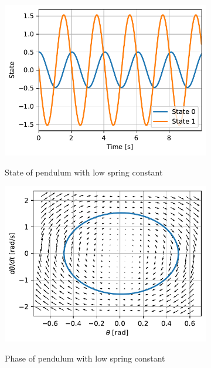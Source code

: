\documentclass{cmc}
\begin{document}
\begin{figure}[H]
  \centering
  \begin{subfigure}[b]{0.49\textwidth}
    { \centering
      \includegraphics[width=\textwidth]{figures/State_Spring_Constant_1(x0_=_[0dot5,_0dot1]).pdf}
    }
    \caption{State of pendulum with low spring constant}
    \label{fig:state-pendulum-spring-constant-1}
  \end{subfigure}
  \begin{subfigure}[b]{0.49\textwidth}
    { \centering
      \includegraphics[width=\textwidth]{figures/Phase_Spring_Constant_1(x0_=_[0dot5,_0dot1]).pdf}
    }
    \caption{Phase of pendulum with low spring constant}
    \label{fig:phase-pendulum-spring-constant-1}
  \end{subfigure}
  \caption{}
  \label{fig:pendulum-spring-constant-1}
\end{figure}
\end{document}
